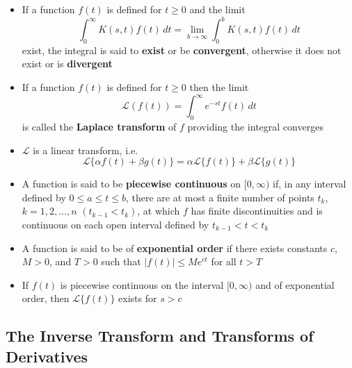 \documentclass{article}
\begin{document}
\begin{itemize}
  \item If a function $f(t)$ is defined for $t \ge 0$ and the limit \[\int_0^\infty K(s, t) f(t) \,dt = \lim_{b \rightarrow \infty} \int_0^b K(s, t) f(t) \,dt\] exist, the integral is said to \textbf{exist} or be \textbf{convergent}, otherwise it does not exist or is \textbf{divergent}

  \item If a function $f(t)$ is defined for $t \ge 0$ then the limit \[\mathcal{L} (f(t)) = \int_0^\infty e^{-s t} f(t) \,dt\] is called the \textbf{Laplace transform} of $f$ providing the integral converges

  \item $\mathcal{L}$ is a linear transform, i.e. \[\mathcal{L}\{\alpha f(t) + \beta g(t)\} = \alpha \mathcal{L}\{f(t)\} + \beta \mathcal{L}\{g(t)\}\]

  \item A function is said to be \textbf{piecewise continuous} on $[0, \infty)$ if, in any interval defined by $0 \le a \le t \le b$, there are at most a finite number of points $t_k$, $k = 1, 2, \ldots, n$ $(t_{k - 1} < t_k)$, at which $f$ has finite discontinuities and is continuous on each open interval defined by $t_{k - 1} < t < t_k$

  \item A function is said to be of \textbf{exponential order} if there exists constants $c$, $M > 0$, and $T > 0$ such that $|f(t)| \le M e^{c t}$ for all $t > T$

  \item If $f(t)$ is piecewise continuous on the interval $[0, \infty)$ and of exponential order, then $\mathcal{L} \{f(t)\}$ exists for $s > c$
\end{itemize}

\subsection{The Inverse Transform and Transforms of Derivatives}
\end{document}
